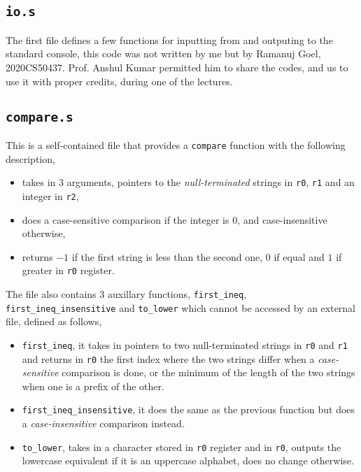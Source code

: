 \documentclass[a4paper]{scrartcl}
\theoremstyle{definition}
\renewcommand{\tt}{\texttt}
\newcommand{\fun}{\texttt}
\newcommand{\reg}{\texttt}
\begin{document}
\subsection*{\tt{io.s}}
The first file defines a few functions for inputting from and outputing to the standard console, this code was not written by me but by Ramanuj Goel, 2020CS50437. Prof. Anshul Kumar permitted him to share the codes, and us to use it with proper credits, during one of the lectures.

\subsection*{\tt{compare.s}}
This is a self-contained file that provides a \fun{compare} function with the following description,
\begin{itemize}
	\item takes in 3 arguments, pointers to the \emph{null-terminated} strings in \reg{r0}, \reg{r1} and an integer in \fun{r2},
	\item does a case-sensitive comparison if the integer is $0$, and case-insensitive otherwise,
	\item returns $-1$ if the first string is less than the second one, $0$ if equal and $1$ if greater in \reg{r0} register.
\end{itemize}

The file also contains 3 auxillary functions, \fun{first_ineq}, \fun{first_ineq_insensitive} and \fun{to_lower} which cannot be accessed by an external file, defined as follows,
\begin{itemize}
	\item \fun{first_ineq}, it takes in pointers to two null-terminated strings in \reg{r0} and \reg{r1} and returns in \reg{r0} the first index where the two strings differ when a \emph{case-sensitive} comparison is done, or the minimum of the length of the two strings when one is a prefix of the other.
	\item \fun{first_ineq_insensitive}, it does the same as the previous function but does a \emph{case-insensitive} comparison instead.
	\item \fun{to_lower}, takes in a character stored in \reg{r0} register and in \reg{r0}, outputs the lowercase equivalent if it is an uppercase alphabet, does no change otherwise.
\end{itemize}
\end{document}
